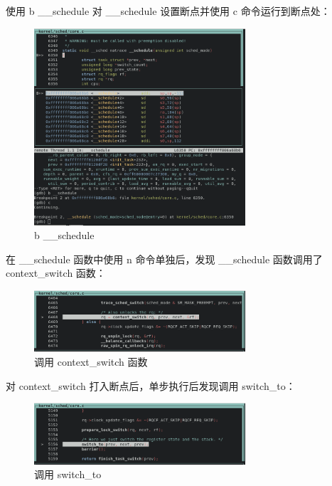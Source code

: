 \documentclass[lang=cn,10pt]{elegantbook}
\begin{document}
使用 b \_\_schedule 对 \_\_schedule 设置断点并使用 c 命令运行到断点处：
\begin{figure}[htbp]
  \centering
  \includegraphics[width=0.7\textwidth]{image/image-20231109202607880.png}
  \caption{b \_\_schedule}
\end{figure}


\newpage
在 \_\_schedule 函数中使用 n 命令单独后，发现 \_\_schedule 函数调用了 context\_switch 函数：
\begin{figure}[htbp]
  \centering
  \includegraphics[width=0.7\textwidth]{image/image-20231109202816225.png}
  \caption{调用 context\_switch 函数}
\end{figure}


\newpage
对 context\_switch 打入断点后，单步执行后发现调用 switch\_to：
\begin{figure}[htbp]
  \centering
  \includegraphics[width=0.7\textwidth]{image/image-20231109203216397.png}
  \caption{调用 switch\_to}
\end{figure}
\end{document}
